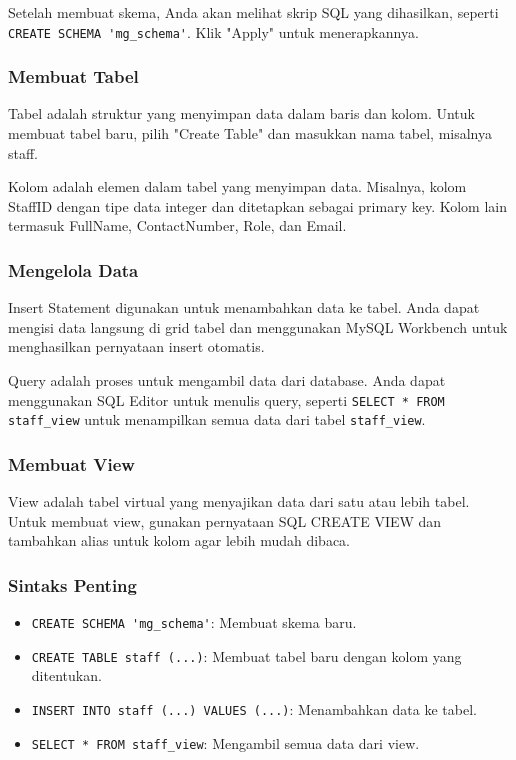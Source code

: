 \documentclass{article}
\begin{document}
Setelah membuat skema, Anda akan melihat skrip SQL yang dihasilkan, seperti \verb|CREATE SCHEMA 'mg_schema'|. Klik "Apply" untuk menerapkannya.

\subsubsection{Membuat Tabel}
Tabel adalah struktur yang menyimpan data dalam baris dan kolom. Untuk membuat tabel baru, pilih "Create Table" dan masukkan nama tabel, misalnya staff.

Kolom adalah elemen dalam tabel yang menyimpan data. Misalnya, kolom StaffID dengan tipe data integer dan ditetapkan sebagai primary key. Kolom lain termasuk FullName, ContactNumber, Role, dan Email.

\subsubsection{Mengelola Data}
Insert Statement digunakan untuk menambahkan data ke tabel. Anda dapat mengisi data langsung di grid tabel dan menggunakan MySQL Workbench untuk menghasilkan pernyataan insert otomatis.

Query adalah proses untuk mengambil data dari database. Anda dapat menggunakan SQL Editor untuk menulis query, seperti \verb|SELECT * FROM staff_view| untuk menampilkan semua data dari tabel \verb|staff_view|.

\subsubsection{Membuat View}
View adalah tabel virtual yang menyajikan data dari satu atau lebih tabel. Untuk membuat view, gunakan pernyataan SQL CREATE VIEW dan tambahkan alias untuk kolom agar lebih mudah dibaca.

\subsubsection{Sintaks Penting}
\begin{itemize}
    \item \verb|CREATE SCHEMA 'mg_schema'|: Membuat skema baru.
    \item \verb|CREATE TABLE staff (...)|: Membuat tabel baru dengan kolom yang ditentukan.
    \item \verb|INSERT INTO staff (...) VALUES (...)|: Menambahkan data ke tabel.
    \item \verb|SELECT * FROM staff_view|: Mengambil semua data dari view.
\end{itemize}
\end{document}
